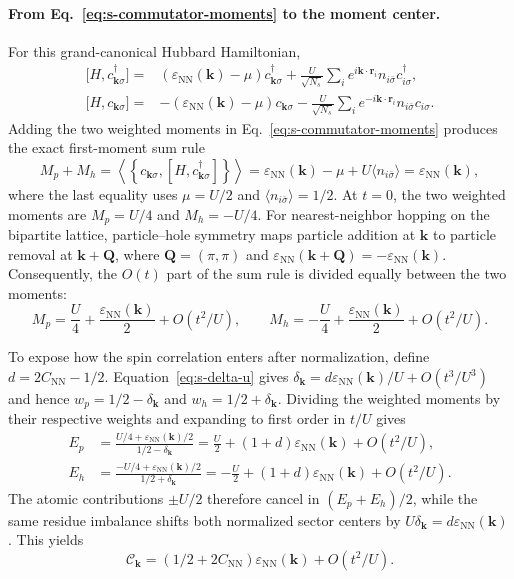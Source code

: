 \documentclass[10pt]{article}
\newcommand{\epsk}{\varepsilon_{\mathrm{NN}}(\mathbf{k})}
\newcommand{\Cnn}{C_{\mathrm{NN}}}
\newcommand{\dk}{\delta_{\mathbf{k}}}
\newcommand{\centermom}{\mathcal C_{\mathbf{k}}}
\begin{document}
\paragraph{From Eq.~\ref{eq:s-commutator-moments} to the moment center.}
For this grand-canonical Hubbard Hamiltonian,
\begin{equation}
\begin{aligned}
\bigl[H,c^\dagger_{\mathbf k\sigma}\bigr]
={}&(\epsk-\mu)c^\dagger_{\mathbf k\sigma}
+\frac{U}{\sqrt{N_s}}\sum_i e^{i\mathbf k\cdot\mathbf r_i}
n_{i\bar\sigma}c^\dagger_{i\sigma},\\
\bigl[H,c_{\mathbf k\sigma}\bigr]
={}&-(\epsk-\mu)c_{\mathbf k\sigma}
-\frac{U}{\sqrt{N_s}}\sum_i e^{-i\mathbf k\cdot\mathbf r_i}
n_{i\bar\sigma}c_{i\sigma}.
\end{aligned}
\label{eq:s-hubbard-commutators}
\end{equation}
Adding the two weighted moments in Eq.~\ref{eq:s-commutator-moments} produces the exact first-moment sum rule
\begin{equation}
M_p+M_h
=\left\langle
\left\{c_{\mathbf k\sigma},
[H,c^\dagger_{\mathbf k\sigma}]
\right\}\right\rangle
=\epsk-\mu+U\langle n_{i\bar\sigma}\rangle
=\epsk ,
\label{eq:s-first-moment-sum}
\end{equation}
where the last equality uses $\mu=U/2$ and
$\langle n_{i\bar\sigma}\rangle=1/2$. At $t=0$, the two weighted moments are
$M_p=U/4$ and $M_h=-U/4$. For nearest-neighbor hopping on the bipartite
lattice, particle--hole symmetry maps particle addition at $\mathbf k$ to
particle removal at $\mathbf k+\mathbf Q$, where
$\mathbf Q=(\pi,\pi)$ and $\varepsilon_{\mathrm{NN}}(\mathbf k+\mathbf Q)=-\epsk$.
Consequently, the $O(t)$ part of the sum rule is divided equally between
the two moments:
\begin{equation}
M_p=\frac{U}{4}+\frac{\epsk}{2}+O(t^2/U),
\qquad
M_h=-\frac{U}{4}+\frac{\epsk}{2}+O(t^2/U).
\label{eq:s-weighted-moments-u}
\end{equation}

To expose how the spin correlation enters after normalization, define
$d=2\Cnn-1/2$. Equation~\ref{eq:s-delta-u} gives
$\dk=d\epsk/U+O(t^3/U^3)$ and hence
$w_p=1/2-\dk$ and $w_h=1/2+\dk$. Dividing the weighted moments by their
respective weights and expanding to first order in $t/U$ gives
\begin{equation}
\begin{aligned}
E_p
&=\frac{U/4+\epsk/2}{1/2-\dk}
=\frac U2+(1+d)\epsk+O(t^2/U),\\
E_h
&=\frac{-U/4+\epsk/2}{1/2+\dk}
=-\frac U2+(1+d)\epsk+O(t^2/U).
\end{aligned}
\label{eq:s-normalized-moments-u}
\end{equation}
The atomic contributions $\pm U/2$ therefore cancel in
$(E_p+E_h)/2$, while the same residue imbalance shifts both normalized
sector centers by $U\dk=d\epsk$. This yields
\begin{equation}
\centermom=(1/2+2\Cnn)\epsk+O(t^2/U).
\label{eq:s-center-u}
\end{equation}
\end{document}
